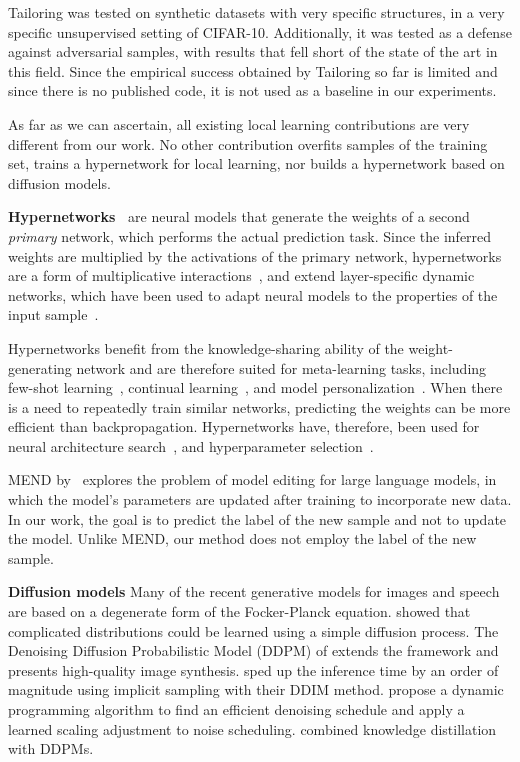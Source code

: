 \documentclass{article}
\theoremstyle{plain}
\begin{document}
Tailoring was tested on synthetic datasets with very specific structures, in a very specific unsupervised setting of CIFAR-10. Additionally, it was tested as a defense against adversarial samples, with results that fell short of the state of the art in this field. Since the empirical success obtained by Tailoring so far is limited and since there is no published code, it is not used as a baseline in our experiments.

As far as we can ascertain, all existing local learning contributions are very different from our work. No other contribution overfits samples of the training set, trains a hypernetwork for local learning, nor builds a hypernetwork based on diffusion models. 

{\bf Hypernetworks~\citep{ha2016hypernetworks}} are neural models that generate the weights of a second {\em primary} network, which performs the actual prediction task. Since the inferred weights are multiplied by the activations of the primary network, hypernetworks are a form of multiplicative interactions~\citep{jayakumar2020multiplicative}, and extend layer-specific dynamic networks, which have been used to adapt neural models to the properties of the input sample~\citep{klein2015dynamic,riegler2015conditioned}.  

Hypernetworks benefit from the knowledge-sharing ability of the weight-generating network and are therefore suited for meta-learning tasks, including few-shot learning~\citep{bertinetto2016learning}, continual learning~\citep{Oswald2020Continual}, and model personalization~\citep{shamsian2021personalized}. When there is a need to repeatedly train similar networks, predicting the weights can be more efficient than backpropagation.  Hypernetworks have, therefore, been used for neural architecture search~\citep{brock2018smash,zhang2018graph}, and hyperparameter selection~\citep{lorraine2018stochastic}. 

MEND by~\citet{mitchell2021fast} explores the problem of model editing for large language models, in which the model's parameters are updated after training to incorporate new data. In our work, the goal is to predict the label of the new sample and not to update the model. Unlike MEND, our method does not employ the label of the new sample.

{\bf Diffusion models\quad}
Many of the recent generative models for images \citep{ho2022cascaded,chen2020wavegrad, dhariwal2021diffusion} and speech \citep{kong2021diffwave,chen2020wavegrad} are based on a degenerate form of the Focker-Planck equation. \citet{sohl2015deep} showed that complicated distributions could be learned using a simple diffusion process. The Denoising Diffusion Probabilistic Model (DDPM) of \citet{ho2020denoising} extends the framework and presents high-quality image synthesis. \citet{ddim} sped up the inference time by an order of magnitude using implicit sampling with their DDIM method. \citet{watson2021learning} propose a dynamic programming algorithm to find an efficient denoising schedule and \citet{noise_scaling_nachamani} apply a learned scaling adjustment to noise scheduling. \citet{luhman2021knowledge} combined knowledge distillation with DDPMs.
\end{document}
